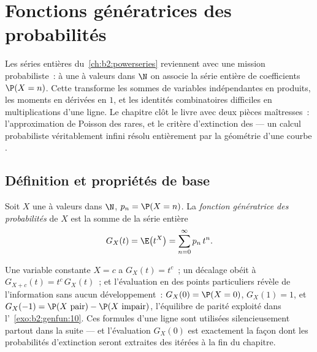 \chapter{Fonctions génératrices des probabilités}\label{ch:b2:genfun}

Les séries entières du~\cref{ch:b2:powerseries} reviennent avec une
mission probabiliste~: à une  à valeurs dans $\N$ on
associe la série entière de coefficients $\P(X = n)$. Cette
\emph{} transforme les sommes de variables
indépendantes en produits, les moments en dérivées en $1$, et les
identités combinatoires difficiles en multiplications d'une ligne. Le
chapitre clôt le livre avec deux pièces maîtresses~: l'approximation
de Poisson des  rares, et le critère d'extinction des
 --- un calcul probabiliste véritablement
infini résolu entièrement par la géométrie d'une courbe .

\section{Définition et propriétés de base}

\begin{definition}\label{def:b2:genfun:pgf}
Soit $X$ une  à valeurs dans $\N$, $p_n = \P(X = n)$.
La \emph{fonction génératrice des probabilités} de $X$ est la somme de la
série entière
\[
G_X(t) = \E\bigl(t^X\bigr) = \sum_{n=0}^{\infty} p_n\,t^n .
\]
\end{definition}

\begin{example}\label{ex:b2:genfun:firstreflexes}
Une variable constante $X = c$ a $G_X(t) = t^c$~; un décalage obéit à
$G_{X+c}(t) = t^c\,G_X(t)$~; et l'évaluation en des points
particuliers révèle de l'information sans aucun développement~: $G_X(0)
= \P(X = 0)$, $G_X(1) = 1$, et $G_X(-1) = \P(X\text{ pair}) -
\P(X\text{ impair})$, l'équilibre de parité exploité dans
l'~\cref{exo:b2:genfun:10}. Ces formules d'une ligne sont utilisées
silencieusement partout dans la suite --- et l'évaluation $G_X(0)$ est
exactement la façon dont les probabilités d'extinction seront extraites
des  itérées à la fin du chapitre.
\end{example}

